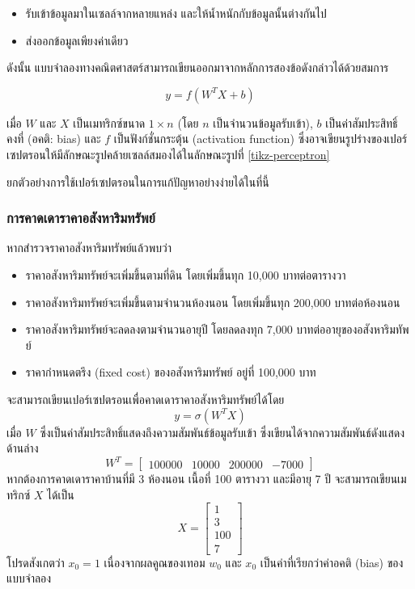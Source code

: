 \documentclass{cpereport}
\begin{document}
\begin{itemize}
    \item รับเข้าข้อมูลมาในเซลล์จากหลายแหล่ง และให้น้ำหนักกับข้อมูลนั้นต่างกันไป
    \item ส่งออกข้อมูลเพียงค่าเดียว
\end{itemize}

ดังนั้น แบบจำลองทางคณิตศาสตร์สามารถเขียนออกมาจากหลักการสองข้อดังกล่าวได้ด้วยสมการ

$$ y = f\left(W^TX+b\right) $$

เมื่อ $W$ และ $X$ เป็นเมทริกซ์ขนาด $1 \times n$ (โดย $n$ เป็นจำนวนข้อมูลรับเข้า), $b$ เป็นค่าสัมประสิทธิ์คงที่ (อคติ: bias)
และ $f$ เป็นฟังก์ชั่นกระตุ้น (activation function) ซึ่งอาจเขียนรูปร่างของเปอร์เซปตรอนให้มีลักษณะรูปคล้ายเซลล์สมองได้ในลักษณะรูปที่ \ref{tikz-perceptron}

ยกตัวอย่างการใช้เปอร์เซปตรอนในการแก้ปัญหาอย่างง่ายได้ในที่นี้

\subsubsection{การคาดเดาราคาอสังหาริมทรัพย์}
หากสำรวจราคาอสังหาริมทรัพย์แล้วพบว่า
\begin{itemize}
    \item ราคาอสังหาริมทรัพย์จะเพิ่มขึ้นตามที่ดิน โดยเพิ่มขึ้นทุก 10,000 บาทต่อตารางวา
    \item ราคาอสังหาริมทรัพย์จะเพิ่มขึ้นตามจำนวนห้องนอน โดยเพิ่มขึ้นทุก 200,000 บาทต่อห้องนอน
    \item ราคาอสังหาริมทรัพย์จะลดลงตามจำนวนอายุปี โดยลดลงทุก 7,000 บาทต่ออายุของอสังหาริมทัพย์
    \item ราคากำหนดตรึง (fixed cost) ของอสังหาริมทรัพย์ อยู่ที่ 100,000 บาท
\end{itemize}
\noindent
จะสามารถเขียนเปอร์เซปตรอนเพื่อคาดเดาราคาอสังหาริมทรัพย์ได้โดย
$$ y = \sigma\left(W^TX\right) $$
เมื่อ $W$ ซึ่งเป็นค่าสัมประสิทธิ์แสดงถึงความสัมพันธ์ข้อมูลรับเข้า ซึ่งเขียนได้จากความสัมพันธ์ดังแสดงด้านล่าง
$$
    W^T = \begin{bmatrix}
        100000 & 10000 & 200000 & -7000
    \end{bmatrix}
$$
หากต้องการคาดเดาราคาบ้านที่มี 3 ห้องนอน เนื้อที่ 100 ตารางวา และมีอายุ 7 ปี จะสามารถเขียนเมทริกซ์ $X$ ได้เป็น
$$
    X = \begin{bmatrix}
        1 \\
        3 \\
        100 \\
        7
    \end{bmatrix}
$$
โปรดสังเกตว่า $x_0 = 1$ เนื่องจากผลคูณของเทอม $w_0$ และ $x_0$ เป็นค่าที่เรียกว่าค่าอคติ (bias) ของแบบจำลอง
\end{document}
